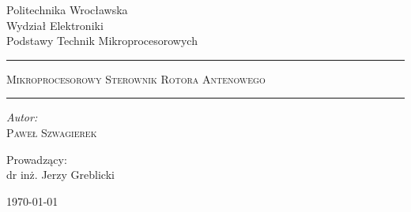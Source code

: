 	\begin{titlepage}

	    \begin{center}
		    \small
		    Politechnika Wrocławska\\
		    Wydział Elektroniki\\
		    Podstawy Technik Mikroprocesorowych
	    \end{center}

	    \vspace{6cm}

		\noindent\rule{\linewidth}{0.4mm}
	    \begin{center}
			\LARGE \textsc{Mikroprocesorowy Sterownik Rotora Antenowego} %
	    \end{center}
		\noindent\rule{\linewidth}{0.4mm}

		\vspace{0.5cm}

	    \begin{flushright}
			\begin{minipage}{6cm}
				\textit{\small Autor:}\\
				\normalsize \textsc{Paweł Szwagierek}
			\end{minipage}

			\vspace{3cm}
			{\small Prowadzący:}\\
			dr inż. Jerzy Greblicki
	    \end{flushright}


	    \begin{center}
		    \today
	    \end{center}	
    \end{titlepage}
